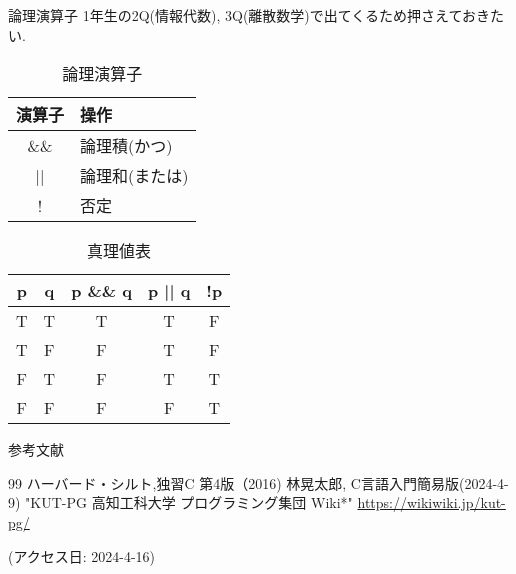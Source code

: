 \documentclass[xdvipdfmx, 8pt, t]{beamer}
\begin{document}
\begin{frame}{論理演算子}
1年生の2Q(情報代数), 3Q(離散数学)で出てくるため押さえておきたい.
    \begin{table}[]
        \centering
        \begin{tabular}{|c|l|}
        \hline
        演算子 & 操作\\
        \hline
        \&\& & 論理積(かつ)\\
        || & 論理和(または)\\
        ! & 否定\\
        \hline
        \end{tabular}
        \caption{論理演算子}
        \label{tab:my_label}
    \end{table}
    \begin{table}[]
        \centering
        \begin{tabular}{|c|c|c|c|c|}
        \hline
        p & q & p \&\& q & p || q & !p\\
        \hline
        T & T & T & T & F\\
        T & F & F & T & F\\
        F & T & F & T & T\\
        F & F & F & F & T\\
        \hline
        \end{tabular}
        \caption{真理値表}
        \label{tab:my_label}
    \end{table}
\end{frame}

\begin{frame}{参考文献}
    \begin{thebibliography} {99}
    ハーバード・シルト,独習C 第4版（2016)
    林晃太郎, C言語入門簡易版(2024-4-9)
    "KUT-PG 高知工科大学 プログラミング集団 Wiki*"
    \url{https://wikiwiki.jp/kut-pg/}
    
    (アクセス日: 2024-4-16)
    \end{thebibliography}
\end{frame}
\end{document}
